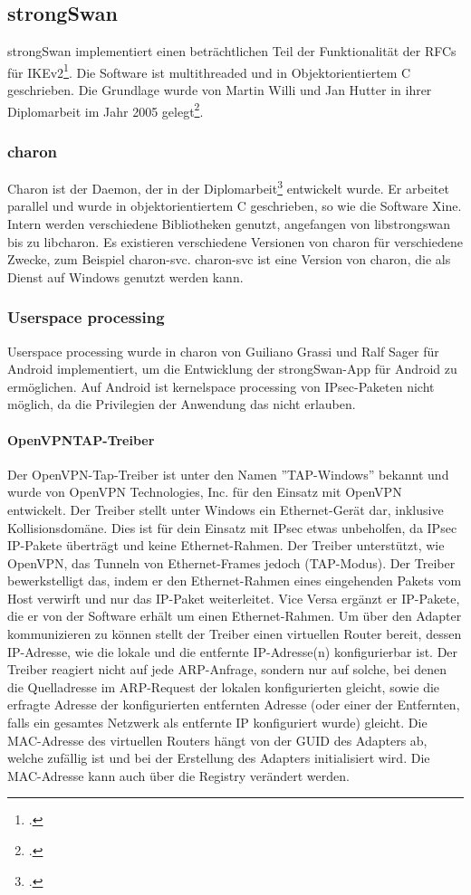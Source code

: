 \subsection{strongSwan}
strongSwan implementiert einen beträchtlichen Teil der Funktionalität der \acp{RFC} für IKEv2\footcite{_ipsecstandards_2016}.
Die Software ist multithreaded und in Objektorientiertem C geschrieben.
Die Grundlage wurde von Martin Willi und Jan Hutter in ihrer Diplomarbeit im Jahr 2005 gelegt\footcite[][]{jan_hutter_strongswan_2005}.
\subsubsection{charon}
Charon ist der Daemon, der in der Diplomarbeit\footcite[][]{jan_hutter_strongswan_2005} entwickelt wurde.
Er arbeitet parallel und wurde in objektorientiertem C geschrieben, so wie die Software Xine.
Intern werden verschiedene Bibliotheken genutzt, angefangen von libstrongswan bis zu libcharon.
Es existieren verschiedene Versionen von charon für verschiedene Zwecke, zum Beispiel
charon-svc. charon-svc ist eine Version von charon, die als Dienst auf Windows genutzt werden kann.
\subsubsection{Userspace processing}
Userspace processing wurde in charon von Guiliano Grassi und Ralf Sager für Android implementiert,
um die Entwicklung der strongSwan-App für Android zu ermöglichen. Auf Android ist kernelspace processing
von \ac{IPsec}-Paketen nicht möglich, da die Privilegien der Anwendung das nicht erlauben.

\paragraph{OpenVPNTAP-Treiber}
Der OpenVPN-Tap-Treiber ist unter den Namen ''TAP-Windows'' bekannt und wurde von
OpenVPN Technologies, Inc. für den Einsatz mit OpenVPN entwickelt.
Der Treiber stellt unter Windows ein Ethernet-Gerät dar, inklusive Kollisionsdomäne.
Dies ist für dein Einsatz mit \ac{IPsec} etwas unbeholfen, da \ac{IPsec} \ac{IP}-Pakete
überträgt und keine Ethernet-Rahmen.
Der Treiber unterstützt, wie OpenVPN, das Tunneln von Ethernet-Frames jedoch (TAP-Modus).
Der Treiber bewerkstelligt das, indem er den Ethernet-Rahmen eines eingehenden Pakets vom
Host verwirft und nur das IP-Paket weiterleitet. Vice Versa ergänzt er IP-Pakete, die er von
der Software erhält um einen Ethernet-Rahmen. Um über den Adapter kommunizieren zu können
stellt der Treiber einen virtuellen Router bereit, dessen \ac{IP}-Adresse, wie die lokale  und
die entfernte IP-Adresse(n) konfigurierbar ist.
Der Treiber reagiert nicht auf jede ARP-Anfrage, sondern nur auf solche, bei denen
die Quelladresse im ARP-Request der lokalen konfigurierten gleicht, sowie die erfragte Adresse
der konfigurierten entfernten Adresse (oder einer der Entfernten, falls ein gesamtes Netzwerk
als entfernte IP konfiguriert wurde) gleicht.
Die MAC-Adresse des virtuellen Routers hängt von der GUID des Adapters ab, welche zufällig ist
und bei der Erstellung des Adapters initialisiert wird. Die MAC-Adresse kann 
auch über die Registry verändert werden.

